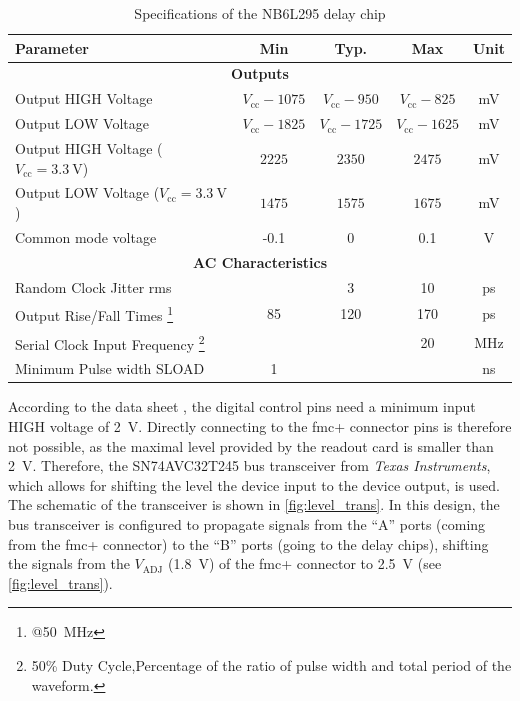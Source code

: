 \begin{table}[tb]
	\caption[NB6L295 Characteristics]{Specifications of the NB6L295 delay chip \cite{NB6L295}}
	\label{tab:nb6l295}
	\begin{minipage}{\textwidth}
		\centering
		\begin{tabularx}{\textwidth}{Xcccc}
			\toprule
			\textbf{Parameter} & \textbf{Min} & \textbf{Typ.} & \textbf{Max} & \textbf{Unit}\\
			\midrule
			\multicolumn{5}{c}{\textbf{Outputs}}  \\
			Output HIGH Voltage & $V_\text{cc} - 1075$ & $V_\text{cc} - 950$ & $V_\text{cc} - 825$ & mV\\
			Output LOW Voltage & $V_\text{cc} - 1825$ & $V_\text{cc} - 1725$ & $V_\text{cc} - 1625$ & mV\\
			Output HIGH Voltage ($V_\text{cc}=\SI{3.3}{\volt}$) & $2225$ & $2350$ & $2475$ & mV\\
			Output LOW Voltage ($V_\text{cc}=\SI{3.3}{\volt}$) & $1475$ & $1575$ & $1675$ & mV\\
			Common mode voltage & -0.1 & 0 & 0.1 & V\\[0.3cm]
			\multicolumn{5}{c}{\textbf{AC Characteristics}}  \\
			Random Clock Jitter \gls{rms}&  & 3 & 10 & ps\\
			Output Rise/Fall Times \footnote{@\SI{50}{\mega \hertz}} & 85 & 120 & 170 & ps\\
			Serial Clock Input Frequency \footnote{50\% Duty Cycle,Percentage of the ratio of pulse width and total period of the waveform.} &  &  & 20 & MHz\\
			Minimum Pulse width SLOAD  & 1 &  &  & ns\\
			\bottomrule
		\end{tabularx}
	\end{minipage}
\end{table}
According to the data sheet \cite{NB6L295}, the digital control pins need a minimum input HIGH voltage of \SI{2}{\volt}.
Directly connecting to the \gls{fmc}+ connector pins is therefore not possible, as the maximal level provided by the readout card is smaller than \SI{2}{\volt}.
Therefore, the SN74AVC32T245 bus transceiver from \textit{Texas Instruments}, which allows for shifting the level the device input to the device output, is used. 
The schematic of the transceiver is shown in \autoref{fig:level_trans}.
In this design, the bus transceiver is configured to propagate signals from the ``A'' ports (coming from the \gls{fmc}+ connector) to the ``B'' ports (going to the delay chips), shifting the signals from the $V_\text{ADJ}$ (\SI{1.8}{\volt}) of the \gls{fmc}+ connector to \SI{2.5}{\volt} (see \autoref{fig:level_trans}).
